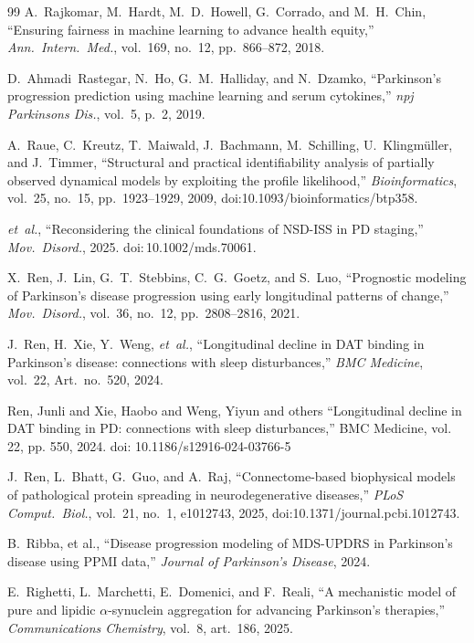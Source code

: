 \begin{thebibliography}{99}
A.~Rajkomar, M.~Hardt, M.~D.~Howell, G.~Corrado, and M.~H.~Chin, ``Ensuring fairness in machine learning to advance health equity,'' \textit{Ann.\ Intern.\ Med.}, vol.~169, no.~12, pp.~866--872, 2018.

D.~Ahmadi~Rastegar, N.~Ho, G.~M.~Halliday, and N.~Dzamko, ``Parkinson's progression prediction using machine learning and serum cytokines,'' \textit{npj Parkinsons Dis.}, vol.~5, p.~2, 2019.

A.~Raue, C.~Kreutz, T.~Maiwald, J.~Bachmann, M.~Schilling, U.~Klingm{\"u}ller, and J.~Timmer, ``Structural and practical identifiability analysis of partially observed dynamical models by exploiting the profile likelihood,'' \textit{Bioinformatics}, vol.~25, no.~15, pp.~1923--1929, 2009, doi:10.1093/bioinformatics/btp358.

\textit{et~al.}, ``Reconsidering the clinical foundations of NSD-ISS in PD staging,'' \textit{Mov.\ Disord.}, 2025. doi:\,10.1002/mds.70061.

X.~Ren, J.~Lin, G.~T.~Stebbins, C.~G.~Goetz, and S.~Luo, ``Prognostic modeling of Parkinson's disease progression using early longitudinal patterns of change,'' \textit{Mov.\ Disord.}, vol.~36, no.~12, pp.~2808--2816, 2021.

J.~Ren, H.~Xie, Y.~Weng, \textit{et~al.}, ``Longitudinal decline in DAT binding in Parkinson's disease: connections with sleep disturbances,'' \textit{BMC Medicine}, vol.~22, Art.\ no.~520, 2024.

 Ren, Junli and Xie, Haobo and Weng, Yiyun and others ``Longitudinal decline in DAT binding in PD: connections with sleep disturbances,'' BMC Medicine, vol. 22, pp. 550, 2024. doi: 10.1186/s12916-024-03766-5

J.~Ren, L.~Bhatt, G.~Guo, and A.~Raj, ``Connectome-based biophysical models of pathological protein spreading in neurodegenerative diseases,'' \textit{PLoS Comput.\ Biol.}, vol.~21, no.~1, e1012743, 2025, doi:10.1371/journal.pcbi.1012743.

B.~Ribba, et al., ``Disease progression modeling of MDS-UPDRS in Parkinson's disease using PPMI data,'' \textit{Journal of Parkinson's Disease}, 2024.

E.~Righetti, L.~Marchetti, E.~Domenici, and F.~Reali, ``A mechanistic model of pure and lipidic $\alpha$-synuclein aggregation for advancing Parkinson's therapies,'' \textit{Communications Chemistry}, vol.~8, art.~186, 2025.


\end{thebibliography}
